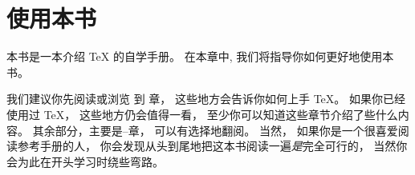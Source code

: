 

\chapter{使用本书}



本书是一本介绍 \TeX{} 的自学手册。
在本章中, 我们将指导你如何更好地使用本书。


我们建议你先阅读或浏览  到 章，
这些地方会告诉你如何上手 \TeX。
如果你已经使用过 \TeX， 这些地方仍会值得一看，
至少你可以知道这些章节介绍了些什么内容。
其余部分，主要是--章，
可以有选择地翻阅。
当然， 如果你是一个很喜爱阅读参考手册的人，
你会发现从头到尾地把这本书阅读一遍\emph{是}完全可行的，
当然你会为此在开头学习时绕些弯路。


